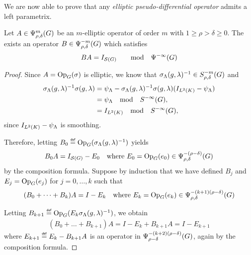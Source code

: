 We are now able to prove that any \emph{elliptic pseudo-differential operator} admits a left parametrix.

\begin{theorem}
\label{theorem:construction_of_parametrices}
    Let $A \in \Psi^{m}_{\rho, \delta}(G)$ be an $m$-elliptic operator of order $m$ with $1 \geq \rho > \delta \geq 0$.
    The exists an operator $B \in \Psi^{-m}_{\rho, \delta}(G)$ which satisfies
    \begin{align*}
        B A = {I_{{\mathcal{S} (G)}}} \qquad \text{mod} \quad {\Psi^{-\infty} (G)}
    \end{align*}
\end{theorem}
\begin{proof}
    Since $A = \mathrm{Op}_{G}(\sigma)$ is elliptic,
    we know that $\sigma_\Lambda(g, \lambda)^{-1} \in S^{-m}_{\rho, \delta}(G)$ and
    \begin{align*}
        \sigma_\Lambda(g, \lambda)^{-1} \sigma(g, \lambda)
        &= \psi_\Lambda - \sigma_\Lambda(g, \lambda)^{-1} \sigma(g, \lambda) ({I_{{L^{2} (K)}}} - \psi_\Lambda)\\
        &= \psi_\Lambda \quad \text{mod} \quad {S^{-\infty} (G)},\\
        &= {I_{{L^{2} (K)}}} \quad \text{mod} \quad {S^{-\infty} (G)},
    \end{align*}
    since ${I_{{L^{2} (K)}}} - \psi_\Lambda$ is smoothing.

    Therefore,
    letting $B_0 \defeq \Op(\sigma_\Lambda(g, \lambda)^{-1})$ yields
    \begin{align*}
        B_0 A = {I_{{\mathcal{S} (G)}}} - E_0 \quad \text{where } E_0 = \mathrm{Op}_{G}(e_0) \in \Psi^{-(\rho - \delta)}_{\rho, \delta}(G)
    \end{align*}
    by the composition formula.
    Suppose by induction that we have defined $B_j$ and $E_j = \mathrm{Op}_{G}(e_j)$ for $j = 0, \dots, k$ such that
    \begin{align*}
        (B_0 + \dots + B_k) A = I - E_k \quad \text{where } E_k = \mathrm{Op}_{G}(e_k) \in \Psi^{-(k + 1)(\rho - \delta)}_{\rho, \delta}(G)
    \end{align*}

    Letting $B_{k + 1} \defeq \Op(E_k \sigma_\Lambda(g, \lambda)^{-1})$,
    we obtain
    \begin{align*}
        (B_0 + \dots + B_{k + 1}) A = I - E_k + B_{k + 1} A = I - E_{k + 1}
    \end{align*}
    where $E_{k + 1} \defeq E_k - B_{k + 1} A$ is an operator in $\Psi^{-(k + 2)(\rho - \delta)}_{\rho - \delta}(G)$,
    again by the composition formula.


\end{proof}
